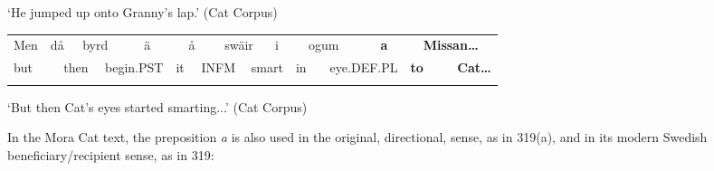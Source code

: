 \begin{styleTranslation}
‘He jumped up onto Granny’s lap.’ (Cat Corpus)

\end{styleTranslation}

\begin{tabular}{llllllllllllllllllll}
\lsptoprule
Men & \multicolumn{2}{l}{då

} & \multicolumn{2}{l}{byrd

} & \multicolumn{2}{l}{ä

} & \multicolumn{2}{l}{å

} & \multicolumn{2}{l}{swäir

} & \multicolumn{2}{l}{i

} & \multicolumn{2}{l}{ogum

} & \multicolumn{2}{l}{{\bfseries a}

} & \multicolumn{2}{l}{{\bfseries Missan…}

} & \\
\multicolumn{2}{l}{but

} & \multicolumn{2}{l}{then

} & \multicolumn{2}{l}{begin.PST

} & \multicolumn{2}{l}{it

} & \multicolumn{2}{l}{INFM

} & \multicolumn{2}{l}{smart

} & \multicolumn{2}{l}{in

} & \multicolumn{2}{l}{eye.DEF.PL

} & \multicolumn{2}{l}{{\bfseries to}

} & \multicolumn{2}{l}{{\bfseries Cat…}

}\\
\lspbottomrule
\end{tabular}

\begin{styleTranslation}
‘But then Cat’s eyes started smarting...’ (Cat Corpus)

\end{styleTranslation}

\begin{styleBodyTextFirst}
In the Mora Cat text, the preposition \textit{a }is also used in the original, directional, sense, as in 319(a), and in its modern Swedish beneficiary/recipient sense, as in 319:

\end{styleBodyTextFirst}


